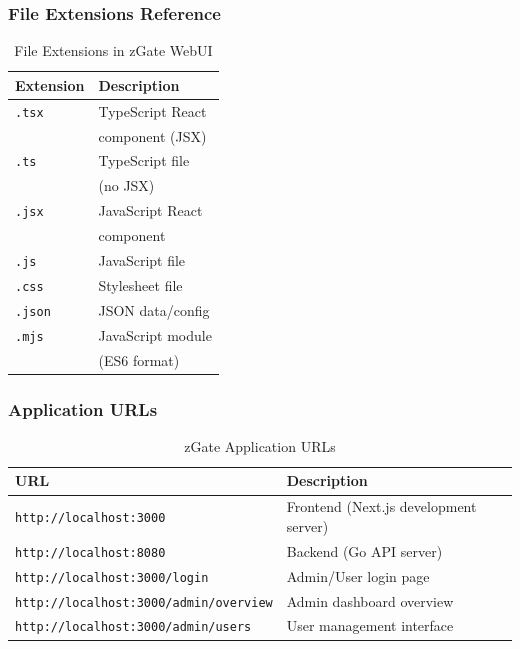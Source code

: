 \subsubsection{File Extensions Reference}

\begin{table}[H]
\centering
\begin{tabular}{|l|l|}
\hline

\textbf{Extension} & \textbf{Description} \\
\hline
\texttt{.tsx} & TypeScript React \\
 & component (JSX) \\
\hline
\texttt{.ts} & TypeScript file \\
 & (no JSX) \\
\hline
\texttt{.jsx} & JavaScript React \\
 & component \\
\hline
\texttt{.js} & JavaScript file \\
\hline
\texttt{.css} & Stylesheet file \\
\hline
\texttt{.json} & JSON data/config \\
\hline
\texttt{.mjs} & JavaScript module \\
 & (ES6 format) \\
\hline
\end{tabular}
\caption{File Extensions in zGate WebUI}
\end{table}

\subsubsection{Application URLs}

\begin{table}[H]
\centering
\begin{tabular}{|l|l|}
\hline

\textbf{URL} & \textbf{Description} \\
\hline
\texttt{http://localhost:3000} & Frontend (Next.js development server) \\
\hline
\texttt{http://localhost:8080} & Backend (Go API server) \\
\hline
\texttt{http://localhost:3000/login} & Admin/User login page \\
\hline
\texttt{http://localhost:3000/admin/overview} & Admin dashboard overview \\
\hline
\texttt{http://localhost:3000/admin/users} & User management interface \\
\hline
\end{tabular}
\caption{zGate Application URLs}
\end{table}

